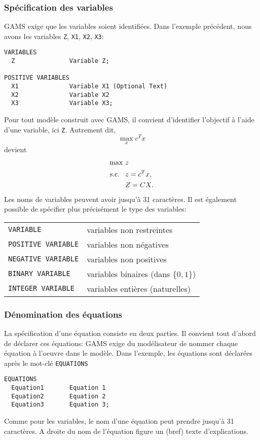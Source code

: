 \subsubsection{Spécification des variables}

GAMS exige que les variables soient identifiées.
Dans l'exemple précédent, nous avons les variables \verb|Z|, \verb|X1|, \verb|X2|, \verb|X3|:
\begin{verbatim}
VARIABLES
  Z               Variable Z;

POSITIVE VARIABLES
  X1              Variable X1 (Optional Text)
  X2              Variable X2
  X3              Variable X3;
\end{verbatim}
Pour tout modèle construit avec GAMS, il convient d'identifier l'objectif à l'aide d'une variable, ici \verb|Z|. Autrement dit,
\[
\max_x c^Tx
\]
devient
\begin{align*}
\max\ & z\\
\mbox{s.c. }\ & z=c^Tx, \\
 & Z=CX.
\end{align*}
Les noms de variables peuvent avoir jusqu'à 31 caractères.
Il est également possible de spécifier plus précisément le type des variables:\\
\begin{tabular}{ll}
\verb|VARIABLE| & variables non restreintes \\
\verb|POSITIVE VARIABLE| & variables non négatives \\
\verb|NEGATIVE VARIABLE| & variables non positives \\
\verb|BINARY VARIABLE| & variables binaires (dans $\lbrace 0, 1\rbrace$) \\
\verb|INTEGER VARIABLE| & variables entières (naturelles)
\end{tabular}

\subsubsection{Dénomination des équations}

La spécification d'une équation consiste en deux parties.
Il convient tout d'abord de déclarer ces équations: GAMS exige du modélisateur de nommer chaque équation à l'oeuvre dans le modèle.
Dans l'exemple, les équations sont déclarées après le mot-clé \verb|EQUATIONS|
\begin{verbatim}
EQUATIONS
  Equation1       Equation 1
  Equation2       Equation 2
  Equation3       Equation 3;
\end{verbatim}
Comme pour les variables, le nom d'une équation peut prendre jusqu'à 31 caractères.
A droite du nom de l'équation figure un (bref) texte d'explications.


